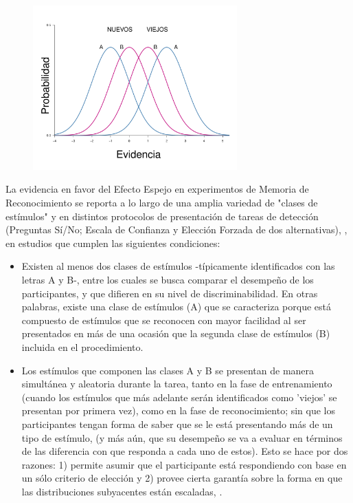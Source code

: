 \begin{figure}[th]
\centering
\includegraphics[width=0.7\textwidth]{Figures/EfectoEspejo}
\caption[Representación gráfica del Efecto Espejo]{}
\label{fig:Ejem_EfectoEspejo}
\end{figure}

La evidencia en favor del Efecto Espejo en experimentos de Memoria de Reconocimiento se reporta a lo largo de una amplia variedad de "clases de estímulos" y en distintos protocolos de presentación de tareas de detección (Preguntas Sí/No; Escala de Confianza y Elección Forzada de dos alternativas), \parencite{Glanzer1990}, en estudios que cumplen las siguientes condiciones:\\

\begin{itemize}
\item Existen al menos dos clases de estímulos -típicamente identificados con las letras A y B-, entre los cuales se busca comparar el desempeño de los participantes, y que difieren en su nivel de discriminabilidad. En otras palabras, existe una clase de estímulos (A) que se caracteriza porque está compuesto de estímulos que se reconocen con mayor facilidad al ser presentados en más de una ocasión que la segunda clase de estímulos (B) incluida en el procedimiento.\\

\item Los estímulos que componen las clases A y B se presentan de manera simultánea y aleatoria durante la tarea, tanto en la fase de entrenamiento (cuando los estímulos que más adelante serán identificados como 'viejos' se presentan por primera vez), como en la fase de reconocimiento; sin que los participantes tengan forma de saber que se le está presentando más de un tipo de estímulo, (y más aún,  que su desempeño se va a evaluar en términos de las diferencia con que responda a cada uno de estos). Esto se hace por dos razones: 1) permite asumir que el participante está respondiendo con base en un sólo criterio de elección y 2) provee cierta garantía sobre la forma en que las distribuciones subyacentes están escaladas, \parencite{DeCarlo2007}.\\
\end{itemize}

